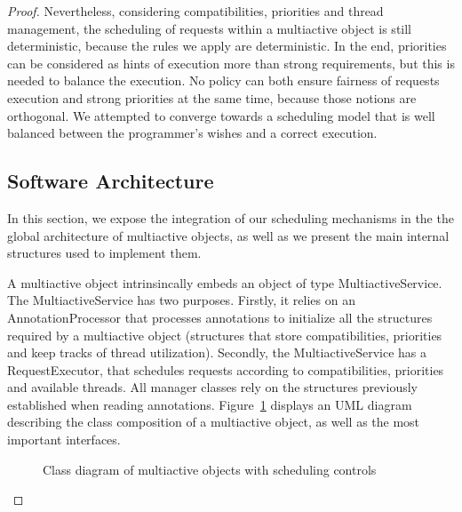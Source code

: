 \documentclass[11pt]{report}
\begin{document}
\begin{proof}
Nevertheless, considering compatibilities, priorities and thread management, the scheduling of requests within a multiactive object is still deterministic, because the rules we apply are deterministic. In the end, priorities can be considered as hints of execution more than strong requirements, but this is needed to balance the execution. No policy can both ensure fairness of requests execution and strong priorities at the same time, because those notions are orthogonal. We attempted to converge towards a scheduling model that is well balanced between the programmer's wishes and a correct execution.


\subsection{Software Architecture}
In this section, we expose the integration of our scheduling mechanisms in the  the global architecture of multiactive objects, as well as we present the main internal structures used to implement them.

A multiactive object intrinsincally embeds an object of type MultiactiveService. The MultiactiveService has two purposes. Firstly, it relies on an AnnotationProcessor that processes annotations to initialize all the structures required by a multiactive object (structures that store compatibilities, priorities and keep tracks of thread utilization). Secondly, the MultiactiveService has a RequestExecutor, that schedules requests according to compatibilities, priorities and available threads. All manager classes rely on the structures previously established when reading annotations. Figure~\ref{fig:uml} displays an UML diagram describing the class composition of a multiactive object, as well as the most important interfaces.

\begin{figure}[!ht]
      \caption{Class diagram of multiactive objects with scheduling controls}
      \label{fig:uml} 
\end{figure}


\end{proof}
\end{document}
